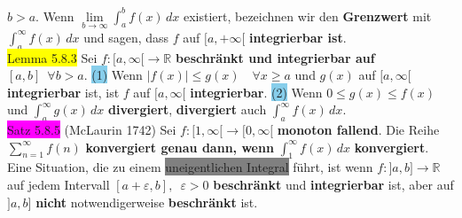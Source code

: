 \documentclass[landscape, 10pt]{article}
\newcommand{\R}{\mathbb{R}}
\begin{document}
\begin{multicols}{3}
                     \textcolor{NavyBlue}{$b>a$}. 
                     Wenn \textcolor{NavyBlue}{
                     $\lim\limits_{b\to\infty}\int_a^bf(x)\,dx$} 
                     existiert, bezeichnen wir den \textbf{Grenzwert} mit 
                     \textcolor{NavyBlue}{$\int_a^\infty f(x)\,dx$} 
                     und sagen, dass \textcolor{NavyBlue}{$f$} auf 
                     \textcolor{NavyBlue}{$[a,+\infty[$} 
                     \textbf{integrierbar ist}.\\
              \colorbox{yellow}{Lemma 5.8.3} 
                     Sei \textcolor{NavyBlue}{$f:[a,\infty[\longrightarrow\R$} 
                     \textbf{beschränkt und integrierbar auf} 
                     \textcolor{NavyBlue}{$[a,b]\enspace\forall b>a$}. 
                     \colorbox{SkyBlue}{(1)} Wenn 
                     \textcolor{NavyBlue}{$|f(x)|\leqslant g(x)\quad\forall x\geqslant a$}
                     und \textcolor{NavyBlue}{$g(x)$} auf \textcolor{NavyBlue}{$[a,\infty[$} 
                     \textbf{integrierbar} ist, ist 
                     \textcolor{NavyBlue}{$f$} auf \textcolor{NavyBlue}{$[a,\infty[$}
                     \textbf{integrierbar}. 
                     \colorbox{SkyBlue}{(2)} Wenn 
                     \textcolor{NavyBlue}{$0\leqslant g(x)\leqslant f(x)$} 
                     und \textcolor{NavyBlue}{$\int_a^\infty g(x)\,dx$} 
                     \textbf{divergiert}, \textbf{divergiert} auch 
                     \textcolor{NavyBlue}{$\int_a^\infty f(x)\,dx$}.\\
              \colorbox{magenta}{Satz 5.8.5} (McLaurin 1742) Sei 
                     \textcolor{NavyBlue}{$f:[1,\infty[\longrightarrow[0,\infty[$} 
                     \textbf{monoton fallend}. Die Reihe 
                     \textcolor{NavyBlue}{$\sum_{n=1}^\infty f(n)$} 
                     \textbf{konvergiert genau dann, wenn} 
                     \textcolor{NavyBlue}{$\int_1^\infty f(x)\,dx$} 
                     \textbf{konvergiert}. \\
              Eine Situation, die zu einem 
                     \colorbox{gray}{uneigentlichen Integral} führt, 
                     ist wenn \textcolor{NavyBlue}{$f:]a,b]\longrightarrow\R$} 
                     auf jedem Intervall 
                     \textcolor{NavyBlue}{$[a+\varepsilon,b],\enspace\varepsilon>0$} 
                     \textbf{beschränkt} und \textbf{integrierbar} ist, aber auf 
                     \textcolor{NavyBlue}{$]a,b]$} \textbf{nicht} notwendigerweise 
                     \textbf{beschränkt} ist. \\

\end{multicols}
\end{document}
